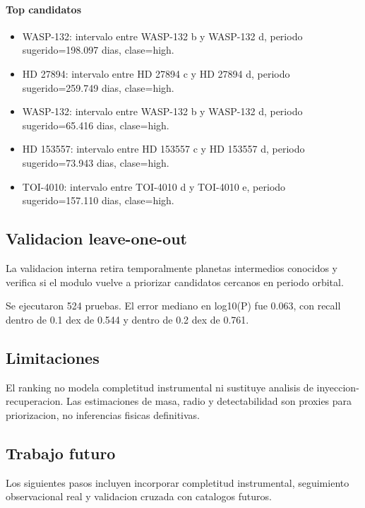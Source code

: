 \paragraph{Top candidatos}

\begin{itemize}

\item WASP-132: intervalo entre WASP-132 b y WASP-132 d, periodo sugerido=198.097 dias, clase=high.

\item HD 27894: intervalo entre HD 27894 c y HD 27894 d, periodo sugerido=259.749 dias, clase=high.

\item WASP-132: intervalo entre WASP-132 b y WASP-132 d, periodo sugerido=65.416 dias, clase=high.

\item HD 153557: intervalo entre HD 153557 c y HD 153557 d, periodo sugerido=73.943 dias, clase=high.

\item TOI-4010: intervalo entre TOI-4010 d y TOI-4010 e, periodo sugerido=157.110 dias, clase=high.

\end{itemize}

\subsection{Validacion leave-one-out}

La validacion interna retira temporalmente planetas intermedios conocidos y verifica si el modulo vuelve a priorizar candidatos cercanos en periodo orbital.

Se ejecutaron 524 pruebas. El error mediano en log10(P) fue 0.063, con recall dentro de 0.1 dex de 0.544 y dentro de 0.2 dex de 0.761.

\subsection{Limitaciones}

El ranking no modela completitud instrumental ni sustituye analisis de inyeccion-recuperacion. Las estimaciones de masa, radio y detectabilidad son proxies para priorizacion, no inferencias fisicas definitivas.

\subsection{Trabajo futuro}

Los siguientes pasos incluyen incorporar completitud instrumental, seguimiento observacional real y validacion cruzada con catalogos futuros.
